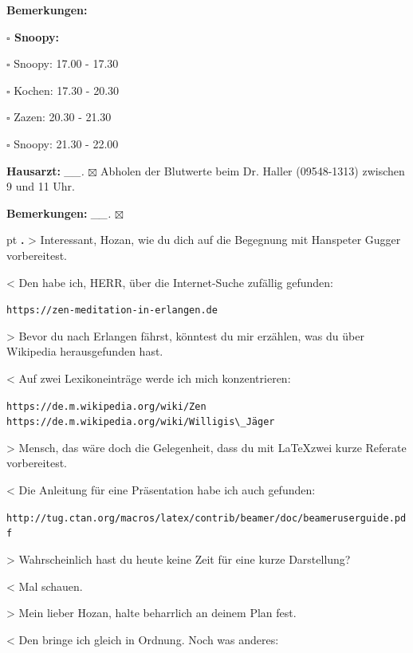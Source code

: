 \documentclass[10pt,a4paper]{article}
\newcounter{notec}
\newcommand\notep[1]{%
  \stepcounter{notec}
  \vskip #1pt
  {\bf\arabic{notec}.}
}
\newcommand\prop[1] {{\color {alizarin} {\bf #1}}}             %
\newcommand\opti[1] {{\color {amethyst} {\bf #1}}}             %
\newcommand\mand[1] {{\color {burntorange} {\bf #1}}}          %
\newcommand\bottomspace{\vskip 4pt}
\newcommand\n[1] { {\sl #1.} \hskip 5pt }
\begin{document}
\begin{mdframed}[style=daystyle]
\begin{labeling}{{\mand {Bemerkungen:}}}
\begin{minipage}{0.75\textwidth}
\begin{labeling}{\prop {$\square$ {Snoopy:}}}
      \item[$\square$ Snoopy:] 17.00 - 17.30
      \item[$\square$ Kochen:] 17.30 - 20.30
        
      \item[$\square$ Zazen:]  20.30 - 21.30
      \item[$\square$ Snoopy:] 21.30 - 22.00
      \end{labeling}
    \end{minipage}
    \bottomspace
  \item[{\opti {Hausarzt:}}]     \n{\_\_} $\boxtimes$ Abholen der Blutwerte beim Dr. Haller (09548-1313)
      zwischen 9 und 11 Uhr.
  \item[{\mand {Bemerkungen:}}]  \n{\_\_} $\boxtimes$
  \end{labeling}
    
  \setcounter{notec}{0}
  
  \notep 0 > Interessant, Hozan, wie du dich auf die Begegnung mit Hanspeter
  Gugger vorbereitest.

  \vskip 2pt
  < Den habe ich, HERR, über die Internet-Suche zufällig gefunden:

  \vskip 2pt
  \verb+https://zen-meditation-in-erlangen.de+

  \vskip 2pt
  > Bevor du nach Erlangen fährst, könntest du mir erzählen, was du über
  Wikipedia herausgefunden hast.

  \vskip 2pt
  < Auf zwei Lexikoneinträge werde ich mich konzentrieren:

  \vskip 2pt
  \verb+https://de.m.wikipedia.org/wiki/Zen+ \\
  \verb+https://de.m.wikipedia.org/wiki/Willigis\_Jäger+ 

  \vskip 2pt
  > Mensch, das wäre doch die Gelegenheit, dass du mit \LaTeX zwei kurze Referate vorbereitest.

  \vskip 2pt
  < Die Anleitung für eine Präsentation habe ich auch gefunden:

  \vskip 2pt
  \verb+http://tug.ctan.org/macros/latex/contrib/beamer/doc/beameruserguide.pdf+

  \vskip 2pt
  > Wahrscheinlich hast du heute keine Zeit für eine kurze Darstellung?

  \vskip 2pt
  < Mal schauen.

  \vskip 2pt
  > Mein lieber Hozan, halte beharrlich an deinem Plan fest.

  \vskip 2pt
  < Den bringe ich gleich in Ordnung. Noch was anderes:

\end{mdframed}
\end{document}
